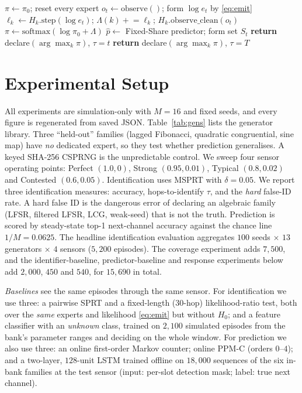 \documentclass[conference]{IEEEtran}
\begin{document}
\begin{algorithm}[t]
\caption{Engagement loop (one emitter, window $T$)}
\label{alg:loop}
\begin{algorithmic}
\STATE $\pi\leftarrow\pi_0$; reset every expert
  \STATE $o_t\leftarrow\mathrm{observe}()$; form $\log e_t$ by \eqref{eq:emit}
     \STATE $\ell_k\leftarrow H_k.\mathrm{step}(\log e_t)$;\;
            $\Lambda(k)\mathrel{+}=\ell_k$;\; $H_k.\mathrm{observe\_clean}(o_t)$
  \ENDFOR
  \STATE $\pi\leftarrow\mathrm{softmax}(\log\pi_0+\Lambda)$
  \STATE $\hat p\leftarrow$ Fixed-Share predictor; form set $S_t$
     \STATE \textbf{return} declare$(\arg\max_k\pi)$, $\tau=t$
  \ENDIF
\ENDFOR
\STATE \textbf{return} declare$(\arg\max_k\pi)$, $\tau=T$
\end{algorithmic}
\end{algorithm}

\section{Experimental Setup}
\label{sec:setup}
All experiments are simulation-only with $M=16$ and fixed seeds, and every
figure is regenerated from saved JSON. Table~\ref{tab:gens} lists the generator
library. Three ``held-out'' families (lagged Fibonacci, quadratic congruential,
sine map) have \emph{no} dedicated expert, so they test whether prediction
generalises. A keyed SHA-256 CSPRNG is the unpredictable control. We sweep four
sensor operating points: Perfect $(1.0,0)$, Strong $(0.95,0.01)$, Typical
$(0.8,0.02)$ and Contested $(0.6,0.05)$. Identification uses MSPRT with
$\delta=0.05$. We report three identification measures: accuracy,
hops-to-identify $\tau$, and the \emph{hard} false-ID rate. A hard false ID is
the dangerous error of declaring an algebraic family (LFSR, filtered LFSR, LCG,
weak-seed) that is not the truth. Prediction is scored by steady-state top-1
next-channel accuracy against the chance line $1/M=0.0625$. The headline
identification evaluation aggregates $100$ seeds $\times$ $13$ generators
$\times$ $4$ sensors ($5{,}200$ episodes). The coverage experiment adds
$7{,}500$, and the identifier-baseline, predictor-baseline and response
experiments below add $2{,}000$, $450$ and $540$, for $15{,}690$ in total.

\emph{Baselines} see the same episodes through the same sensor. For
identification we use three: a pairwise SPRT and a fixed-length ($30$-hop)
likelihood-ratio test, both over the \emph{same} experts and likelihood
\eqref{eq:emit} but without $H_0$; and a feature classifier with an
\emph{unknown} class, trained on $2{,}100$ simulated episodes from the bank's
parameter ranges and deciding on the whole window. For prediction we also use
three: an online first-order Markov counter; online PPM-C (orders $0$--$4$);
and a two-layer, $128$-unit LSTM trained offline on $18{,}000$ sequences of the
six in-bank families at the test sensor (input: per-slot detection mask; label:
true next channel).
\end{document}
